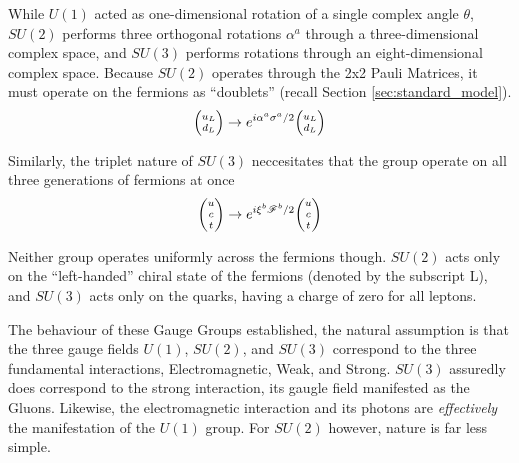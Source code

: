     While $U(1)$ acted as one-dimensional rotation of a single complex angle $\theta$,
        $SU(2)$ performs three orthogonal rotations $\alpha^a$ through a three-dimensional complex space,
        and $SU(3)$ performs rotations through an eight-dimensional complex space.
    Because $SU(2)$ operates through the 2x2 Pauli Matrices, it must operate on the fermions as ``doublets''
        (recall Section \ref{sec:standard_model}).
    \begin{equation}
        \minimatrix{u_L \\ d_L} \to e^{i \alpha^a \sigma^a / 2} \minimatrix{u_L \\ d_L}
    \end{equation}

    Similarly, the triplet nature of $SU(3)$ neccesitates that the group operate on all three generations of fermions at once
    \begin{equation}
        \minimatrix{u\\c\\t} \to e^{i \xi^b \mathscr{F}^b / 2} \minimatrix{u\\c\\t}
    \end{equation}

    Neither group operates uniformly across the fermions though.
    $SU(2)$ acts only on the ``left-handed'' chiral state of the fermions (denoted by the subscript L),
        and $SU(3)$ acts only on the quarks, having a charge of zero for all leptons.

    The behaviour of these Gauge Groups established, the natural assumption is that the three gauge fields
        $U(1)$, $SU(2)$, and $SU(3)$ correspond to the three fundamental interactions,
        Electromagnetic, Weak, and Strong.
    $SU(3)$ assuredly does correspond to the strong interaction, its gaugle field manifested as the Gluons.
    Likewise, the electromagnetic interaction and its photons are \textit{effectively} the manifestation of the $U(1)$ group. 
    For $SU(2)$ however, nature is far less simple.

    



    
    \cite{Osborn_notes}
    \cite{Peskin_book}
    \cite{Halzen_book}

